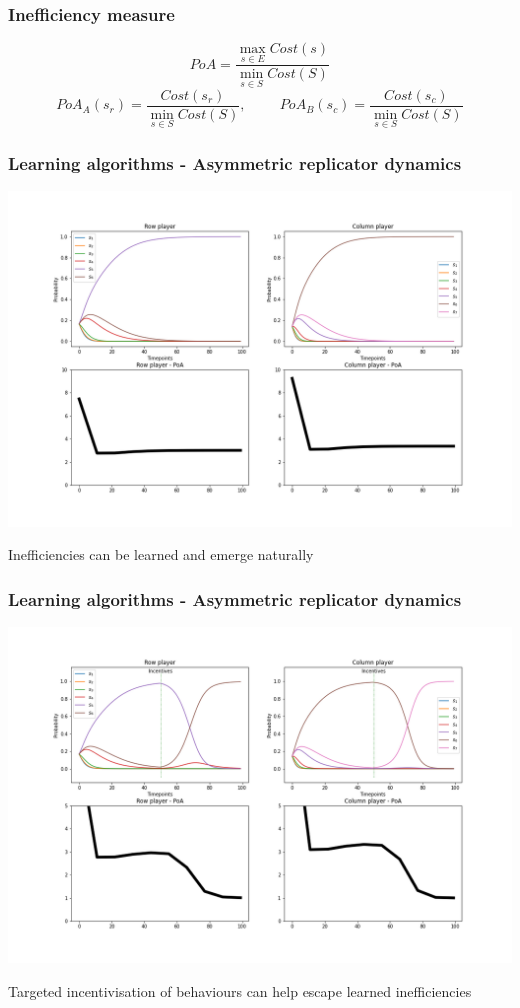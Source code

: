 \begin{frame}
    \frametitle{Inefficiency measure}

    \begin{equation*}
        PoA = \frac{\max_{s \in E} Cost(s)}{\min_{s \in S} Cost(S)}
    \end{equation*}
    \pause
    \footnotesize
    \vspace{1cm}
    \begin{equation*}
        PoA_A(s_r) = \frac{Cost(s_r)}{\min_{s \in S} Cost(S)}, \hspace{1cm} 
        PoA_B(s_c) = \frac{Cost(s_c)}{\min_{s \in S} Cost(S)}
    \end{equation*}
\end{frame}


\begin{frame}
    \frametitle{Learning algorithms - Asymmetric replicator dynamics}

    \includegraphics[scale=0.28]{Bin/ARD_game.png}
\end{frame}

\begin{frame}
    \centering
    \Huge{
    Inefficiencies can be learned and emerge naturally
    }
\end{frame}


\begin{frame}
    \frametitle{Learning algorithms - Asymmetric replicator dynamics}

    \includegraphics[scale=0.28]{Bin/ARD_penalty_game.png}
    
\end{frame}


\begin{frame}
    \centering
    \Huge{
    Targeted incentivisation of behaviours can help escape learned inefficiencies
    }
\end{frame}
